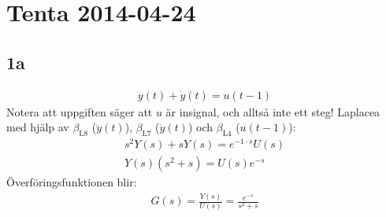 \documentclass[a4paper]{article}
\newcommand{\mhb}[1]{$\beta_{\text{#1}}$}     %
\begin{document}

%
%
%
%



\section{Tenta 2014-04-24}
\subsection{1a}
\begin{align*}
  \ddot{y}(t) + \dot{y}(t) = u(t - 1)
\end{align*}
Notera att uppgiften säger att $u$ är insignal, och alltså inte ett steg!
%
Laplacea med hjälp av \mhb{L8} ($\ddot{y}(t)$), \mhb{L7} ($\dot{y}(t)$) och \mhb{L4} ($u(t - 1)$):
\begin{align*}
  s^2Y(s) + sY(s) = e^{-1 \cdot s}U(s) \\
  Y(s)(s^2 + s) = U(s)e^{-s}
\end{align*}
Överföringsfunktionen blir:
\begin{align*}
  G(s) = \frac{Y(s)}{U(s)} = \frac{e^{-s}}{s^2 + s}
\end{align*}
\end{document}
